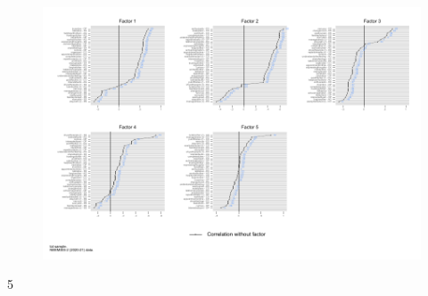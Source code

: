 \documentclass[a4paper, 12pt, onecolumn]{article}
\begin{document}
\begin{figure}[!h]
\raggedright
\includegraphics[scale=0.8]{INPUT/factor2020_tot_without}
\caption{}
\label{fig:efa20}
\end{figure}




\clearpage
\newpage
\setcounter{tocdepth}5
\tableofcontents
\end{document}
